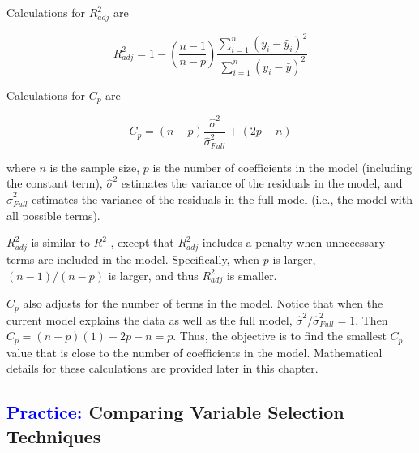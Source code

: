 \documentclass[
]{report}
\begin{document}
Calculations for \(\scriptstyle R^2_{adj}\) are

\begin{equation}
\label{R2Adj}
R^2_{adj}  = 1 - (\frac{n-1}{n-p})\frac{\sum_{i=1}^{n}({y}_i - \hat{y}_i)^2}{\sum_{i=1}^{n}({y}_i - \bar{y})^2}
\tag{3.3}
\end{equation}

Calculations for \(\scriptstyle C_p\) are

\begin{equation}
\label{Cp}
C_p  = (n-p)\frac{\hat{\sigma}^2}{\hat{\sigma}^2_{Full}} + (2p-n)
\tag{3.4}
\end{equation}

where \(\scriptstyle n\) is the sample size, \(\scriptstyle p\) is the number of coefficients in the model (including the constant term), \(\scriptstyle \hat{\sigma}^2\) estimates the variance of the residuals in the model, and \(\scriptstyle \hat{\sigma}^2_{Full}\) estimates the variance of the residuals in the full model (i.e., the model with all possible terms).

\(\scriptstyle R^2_{adj}\) is similar to \(\scriptstyle {R}^2\) , except that \(\scriptstyle R^2_{adj}\) includes a penalty when unnecessary terms are included in the model. Specifically, when \(\scriptstyle p\) is larger, \(\scriptstyle (n - 1)/(n - p)\) is larger, and thus \(\scriptstyle R^2_{adj}\) is smaller.

\(\scriptstyle C_p\) also adjusts for the number of terms in the model. Notice that when the current model explains the data as well as the full model, \(\scriptstyle \hat{\sigma}^2 / \hat{\sigma}^2_{Full} = 1\). Then \(\scriptstyle C_p = (n - p)(1) + 2p - n = p\). Thus, the objective is to find the smallest
\(\scriptstyle C_p\) value that is close to the number of coefficients in the model. Mathematical details for these calculations are provided later in this chapter.

\hypertarget{comparing-variable-selection-techniques}{%
\subsection*{\texorpdfstring{\textcolor{blue}{Practice:} Comparing Variable Selection Techniques}{ Comparing Variable Selection Techniques}}\label{comparing-variable-selection-techniques}}

\vspace{-1em}
\end{document}
